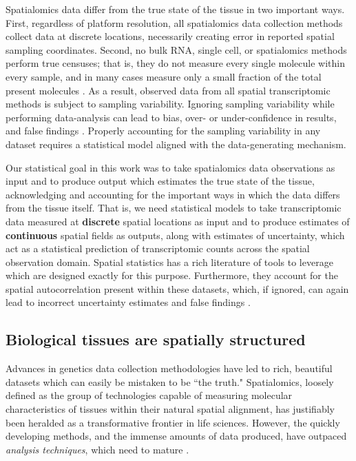 \documentclass[10pt,letterpaper]{article}
\begin{document}
Spatialomics data differ from the true state of the tissue in two important ways. First, regardless of platform resolution, all spatialomics data collection methods collect data at discrete locations, necessarily creating error in reported spatial sampling coordinates. Second, no bulk RNA, single cell, or spatialomics methods perform true censuses; that is, they do not measure every single molecule within every sample, and in many cases measure only a small fraction of the total present molecules \cite{Yue2023,Wang2023}. As a result, observed data from all spatial transcriptomic methods is subject to sampling variability. Ignoring sampling variability while performing data-analysis can lead to bias, over- or under-confidence in results, and false findings \cite{li2019a}. Properly accounting for the sampling variability in any dataset requires a statistical model aligned with the data-generating mechanism.

Our statistical goal in this work was to take spatialomics data observations as input and to produce output which estimates the true state of the tissue, acknowledging and accounting for the important ways in which the data differs from the tissue itself. That is, we need statistical models to take transcriptomic data measured at \textbf{discrete} spatial locations as input and to produce estimates of \textbf{continuous} spatial fields as outputs, along with estimates of uncertainty, which act as a statistical prediction of transcriptomic counts across the spatial observation domain. Spatial statistics has a rich literature of tools to leverage which are designed exactly for this purpose. Furthermore, they account for the spatial autocorrelation present within these datasets, which, if ignored, can again lead to incorrect uncertainty estimates and false findings \cite{cannon2001}.

\subsection*{Biological tissues are spatially structured}

Advances in genetics data collection methodologies have led to rich, beautiful datasets which can easily be mistaken to be ``the truth."  Spatialomics, loosely defined as the group of technologies capable of measuring molecular characteristics of tissues within their natural spatial alignment, has justifiably been heralded as a transformative frontier in life sciences. However, the quickly developing methods, and the immense amounts of data produced, have outpaced \textit{analysis techniques}, which need to mature \cite{bressan2023}.
\end{document}

